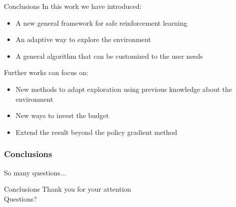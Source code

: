 \documentclass{beamer}
\begin{document}
\begin{frame}{Conclusions}
In this work we have introduced:
\begin{itemize}
\item A new general framework for safe reinforcement learning
\item An adaptive way to explore the environment
\item A general algorithm that can be customized to the user needs
\end{itemize}
\vfill
Further works can focus on:
\begin{itemize}
\item New methods to adapt exploration using previous knowledge about the environment
\item New ways to invest the budget
\item Extend the result beyond the policy gradient method
\end{itemize}

\end{frame}

\begin{frame}
\frametitle{Conclusions}
\LARGE So many questions... \normalsize

\vfill

\centering
{}
\end{frame}

\begin{frame}{Conclusions}
\centering
\LARGE Thank you for your attention\\
\vspace{2cm}
Questions?
\end{frame}
\end{document}
